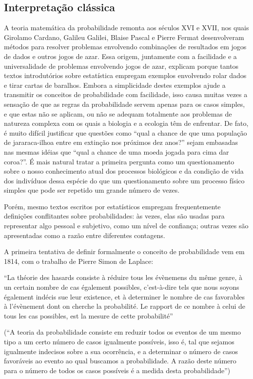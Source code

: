 \documentclass[12pt,a4paper]{article}
\begin{document}
\subsection{Interpretação clássica}
A teoria matemática da probabilidade remonta aos séculos XVI e XVII, nos quais Girolamo Cardano, Galileu Galilei, Blaise Pascal
e Pierre Fermat desenvolveram métodos para resolver problemas envolvendo combinações de resultados em jogos de dados e outros
jogos de azar. 
Essa origem, juntamente com a facilidade e a universalidade de problemas envolvendo jogos de azar, explicam porque tantos textos
introdutórios sobre estatística empregam exemplos envolvendo rolar dados e tirar cartas de baralhos. Embora a simplicidade
destes exemplos ajude a transmitir os conceitos de probabilidade com facilidade, isso causa muitas vezes a sensação de que
as regras da probabilidade servem apenas para os casos simples, e que estas não se aplicam, ou não se adequam totalmente aos 
problemas de natureza complexa com os quais a biologia e a ecologia têm de enfrentar. De fato, é muito difícil justificar que
questões como ``qual a chance de que uma população de jararaca-ilhoa entre em extinção nos próximos dez anos?'' sejam embasadas
nas mesmas idéias que ``qual a chance de uma moeda jogada para cima dar coroa?''. É mais natural tratar a primeira pergunta como
um questionamento sobre o nosso conhecimento atual dos processos biológicos e da condição de vida dos indivíduos dessa espécie
do que um questionamento sobre um processo físico simples que pode ser repetido um grande número de vezes. 

Porém, mesmo textos escritos por estatísticos empregam frequentemente definições conflitantes sobre probabilidades: às vezes,
elas são usadas para representar algo pessoal e subjetivo, como um nível de confiança; outras vezes são apresentadas como a
razão entre diferentes contagens.

A primeira tentativa de definir formalmente o conceito de probabilidade vem em 1814,
com o trabalho de Pierre Simon de Laplace:

``La théorie des hasards consiste à réduire tous les évènemens du même genre, à un certain nombre de cas également
possibles, c'est-à-dire tels que nous soyons également indécis sue leur existence, et à determiner le nombre de cas
favorables à l'évènement dont on cherche la probabilité. Le rapport de ce nombre à celui de tous les cas possibles,
est la mesure de cette probabilité'' \cite{Laplace1814}

(``A teoria da probabilidade consiste em reduzir todos os eventos de um mesmo tipo a um certo número de casos igualmente
possíveis, isso é, tal que sejamos igualmente indecisos sobre a sua ocorrência, e a determinar o número de casos
favoráveis ao evento ao qual buscamos a probabilidade. A razão deste número para o número de todos os casos possíveis
é a medida desta probabilidade'')
\end{document}
